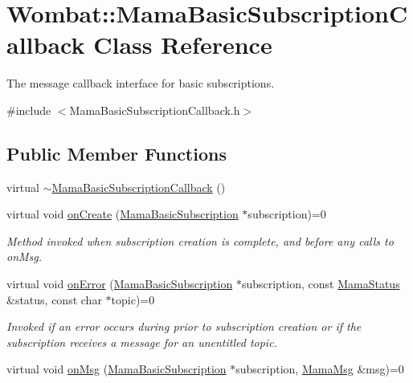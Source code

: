 \hypertarget{classWombat_1_1MamaBasicSubscriptionCallback}{
\section{Wombat::MamaBasicSubscriptionCallback Class Reference}
\label{classWombat_1_1MamaBasicSubscriptionCallback}
}


The message callback interface for basic subscriptions.  


{\ttfamily \#include $<$MamaBasicSubscriptionCallback.h$>$}\subsection*{Public Member Functions}
\begin{DoxyCompactItemize}
\item 
virtual \hyperlink{classWombat_1_1MamaBasicSubscriptionCallback_ac9999ee1ad50f810758079b7c34e8ca5}{$\sim$MamaBasicSubscriptionCallback} ()
\item 
virtual void \hyperlink{classWombat_1_1MamaBasicSubscriptionCallback_ab0bb7b11c7b81d411b23e73edfddfd9b}{onCreate} (\hyperlink{classWombat_1_1MamaBasicSubscription}{MamaBasicSubscription} $\ast$subscription)=0
\begin{DoxyCompactList}\small\item\em Method invoked when subscription creation is complete, and before any calls to {\ttfamily onMsg}. \item\end{DoxyCompactList}\item 
virtual void \hyperlink{classWombat_1_1MamaBasicSubscriptionCallback_a55eee815114faaccdb9a21cbfa230683}{onError} (\hyperlink{classWombat_1_1MamaBasicSubscription}{MamaBasicSubscription} $\ast$subscription, const \hyperlink{classWombat_1_1MamaStatus}{MamaStatus} \&status, const char $\ast$topic)=0
\begin{DoxyCompactList}\small\item\em Invoked if an error occurs during prior to subscription creation or if the subscription receives a message for an unentitled topic. \item\end{DoxyCompactList}\item 
virtual void \hyperlink{classWombat_1_1MamaBasicSubscriptionCallback_a60c045b907deccf84d0398d6501d31d2}{onMsg} (\hyperlink{classWombat_1_1MamaBasicSubscription}{MamaBasicSubscription} $\ast$subscription, \hyperlink{classWombat_1_1MamaMsg}{MamaMsg} \&msg)=0

\end{DoxyCompactItemize}
